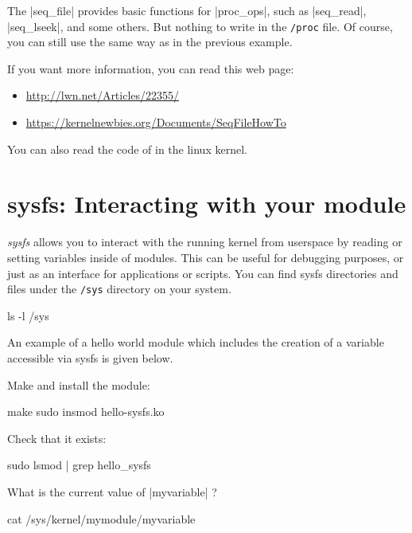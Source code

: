 \documentclass[10pt, oneside]{book}
\begin{document}
The \cpp|seq_file| provides basic functions for \cpp|proc_ops|, such as \cpp|seq_read|, \cpp|seq_lseek|, and some others.
But nothing to write in the \verb|/proc| file.
Of course, you can still use the same way as in the previous example.


If you want more information, you can read this web page:

\begin{itemize}
  \item \url{http://lwn.net/Articles/22355/}
  \item \url{https://kernelnewbies.org/Documents/SeqFileHowTo}
\end{itemize}

You can also read the code of  in the linux kernel.

\section{sysfs: Interacting with your module}
\label{sec:sysfs}
\emph{sysfs} allows you to interact with the running kernel from userspace by reading or setting variables inside of modules.
This can be useful for debugging purposes, or just as an interface for applications or scripts.
You can find sysfs directories and files under the \verb|/sys| directory on your system.

\begin{codebash}
ls -l /sys
\end{codebash}

An example of a hello world module which includes the creation of a variable accessible via sysfs is given below.


Make and install the module:

\begin{codebash}
make
sudo insmod hello-sysfs.ko
\end{codebash}

Check that it exists:

\begin{codebash}
sudo lsmod | grep hello_sysfs
\end{codebash}

What is the current value of \cpp|myvariable| ?

\begin{codebash}
cat /sys/kernel/mymodule/myvariable
\end{codebash}
\end{document}
